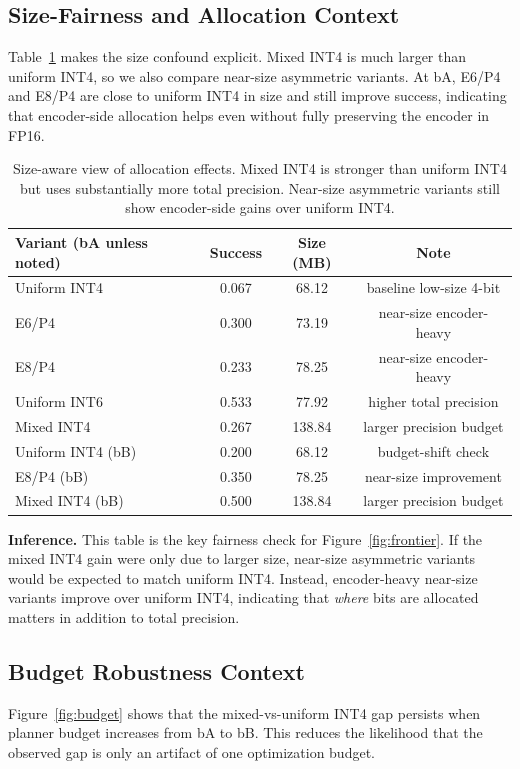 \documentclass{article}
\begin{document}
\subsection{Size-Fairness and Allocation Context}
Table~\ref{tab:sizefair} makes the size confound explicit.
Mixed INT4 is much larger than uniform INT4, so we also compare near-size asymmetric variants.
At bA, E6/P4 and E8/P4 are close to uniform INT4 in size and still improve success, indicating that encoder-side allocation helps even without fully preserving the encoder in FP16.

\begin{table}[h]
\centering
\small
\begin{tabular}{lccc}
\toprule
Variant (bA unless noted) & Success & Size (MB) & Note \\
\midrule
Uniform INT4 & 0.067 & 68.12 & baseline low-size 4-bit \\
E6/P4 & 0.300 & 73.19 & near-size encoder-heavy \\
E8/P4 & 0.233 & 78.25 & near-size encoder-heavy \\
Uniform INT6 & 0.533 & 77.92 & higher total precision \\
Mixed INT4 & 0.267 & 138.84 & larger precision budget \\
\midrule
Uniform INT4 (bB) & 0.200 & 68.12 & budget-shift check \\
E8/P4 (bB) & 0.350 & 78.25 & near-size improvement \\
Mixed INT4 (bB) & 0.500 & 138.84 & larger precision budget \\
\bottomrule
\end{tabular}
\caption{Size-aware view of allocation effects. Mixed INT4 is stronger than uniform INT4 but uses substantially more total precision. Near-size asymmetric variants still show encoder-side gains over uniform INT4.}
\label{tab:sizefair}
\end{table}

\noindent\textbf{Inference.}
This table is the key fairness check for Figure~\ref{fig:frontier}.
If the mixed INT4 gain were only due to larger size, near-size asymmetric variants would be expected to match uniform INT4.
Instead, encoder-heavy near-size variants improve over uniform INT4, indicating that \emph{where} bits are allocated matters in addition to total precision.

\subsection{Budget Robustness Context}
Figure~\ref{fig:budget} shows that the mixed-vs-uniform INT4 gap persists when planner budget increases from bA to bB.
This reduces the likelihood that the observed gap is only an artifact of one optimization budget.
\end{document}
